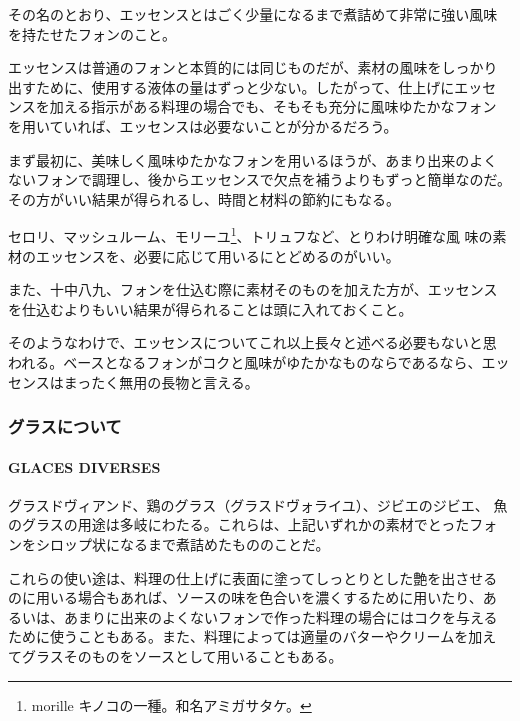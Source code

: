 \documentclass[twoside,12Q,b5j]{escoffierltjsbook}
\newenvironment{recette}{\begin{small}\begin{spacing}{1}\begin{multicols}{2}}{\end{multicols}\end{spacing}\end{small}}
\begin{document}
\begin{recette}
その名のとおり、エッセンスとはごく少量になるまで煮詰めて非常に強い風味
を持たせたフォンのこと。

エッセンスは普通のフォンと本質的には同じものだが、素材の風味をしっかり
出すために、使用する液体の量はずっと少ない。したがって、仕上げにエッセ
ンスを加える指示がある料理の場合でも、そもそも充分に風味ゆたかなフォン
を用いていれば、エッセンスは必要ないことが分かるだろう。

まず最初に、美味しく風味ゆたかなフォンを用いるほうが、あまり出来のよく
ないフォンで調理し、後からエッセンスで欠点を補うよりもずっと簡単なのだ。
その方がいい結果が得られるし、時間と材料の節約にもなる。

セロリ、マッシュルーム、モリーユ\footnote{morille
  キノコの一種。和名アミガサタケ。}、トリュフなど、とりわけ明確な風
味の素材のエッセンスを、必要に応じて用いるにとどめるのがいい。

また、十中八九、フォンを仕込む際に素材そのものを加えた方が、エッセンス
を仕込むよりもいい結果が得られることは頭に入れておくこと。

そのようなわけで、エッセンスについてこれ以上長々と述べる必要もないと思
われる。ベースとなるフォンがコクと風味がゆたかなものならであるなら、エッ
センスはまったく無用の長物と言える。

\vspace*{1.7\zw}

\subsubsection{グラスについて}\label{ux30b0ux30e9ux30b9ux306bux3064ux3044ux3066}

\paragraph{GLACES DIVERSES}\label{glaces-diverses}


グラスドヴィアンド、鶏のグラス（グラスドヴォライユ）、ジビエのジビエ、
魚のグラスの用途は多岐にわたる。これらは、上記いずれかの素材でとったフォ
ンをシロップ状になるまで煮詰めたもののことだ。

これらの使い途は、料理の仕上げに表面に塗ってしっとりとした艶を出させる
のに用いる場合もあれば、ソースの味を色合いを濃くするために用いたり、あ
るいは、あまりに出来のよくないフォンで作った料理の場合にはコクを与える
ために使うこともある。また、料理によっては適量のバターやクリームを加え
てグラスそのものをソースとして用いることもある。


\end{recette}
\end{document}
